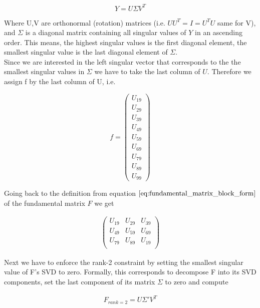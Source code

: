 \documentclass{paper}
\begin{document}
\begin{equation}
    Y = U \Sigma V^{T}
\label{eq:svd_y}
\end{equation}

Where U,V are orthonormal (rotation) matrices (i.e. $U U^{T} = I = U^{T} U$ same for V), and $\Sigma$ is a diagonal matrix containing all singular values of $Y$ in an ascending order. This means, the highest singular values is the first diagonal element, the smallest singular value is the last diagonal element of $\Sigma$. \\

Since we are interested in the left singular vector that corresponds to the the smallest singular values in $\Sigma$ we have to take the last column of $U$. Therefore we assign f by the last column of U, i.e. 

\begin{equation}
    f = \left(\begin{array}{c}
U_{19} \\
U_{29} \\
U_{39} \\
U_{49} \\
U_{59} \\
U_{69} \\
U_{79} \\
U_{89} \\
U_{99}
\end{array}
\right)
\end{equation}
 
Going back to the definition from equation $\ref{eq:fundamental_matrix_block_form}$ of the fundamental matrix $F$ we get

\begin{align}
\left(\begin{array}{ccc}
U_{19} & U_{29} & U_{39} \\
U_{49} & U_{59} & U_{69} \\
U_{79} & U_{89} & U_{19} \\
\end{array} \right)
\end{align}


Next we have to enforce the rank-2 constraint by setting the smallest singular value of F's SVD to zero. Formally, this corresponds to decompose F into its SVD components, set the last component of its matrix $\Sigma$ to zero and compute 

\begin{align}
    F_{rank=2} = U \Sigma' V^{T}
\end{align}
\end{document}
